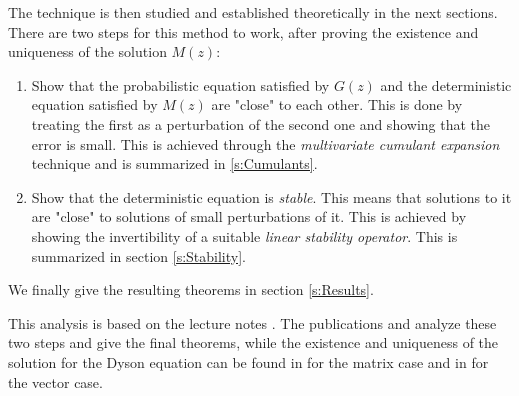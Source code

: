 \documentclass[11pt, a4paper, oneside]{book}
\numberwithin{equation}{chapter}
\begin{document}
 The technique is then studied and established theoretically in the next sections. There are two steps for this method to work, after proving the existence and uniqueness of the solution $M(z)$:
\begin{enumerate}
    \item Show that the probabilistic equation satisfied by $G(z)$ and the deterministic equation satisfied by $M(z)$ are "close" to each other. This is done by treating the first as a perturbation of the second one and showing that the error is small. This is achieved through the \textit{multivariate cumulant expansion} technique and is summarized in \ref{s:Cumulants}.

    \item Show that the deterministic equation is \textit{stable}. This means that solutions to it are "close" to solutions of small perturbations of it. This is achieved by showing the invertibility of a suitable \textit{linear stability operator}. This is summarized in section \ref{s:Stability}.
\end{enumerate}
We finally give the resulting theorems in section \ref{s:Results}. 

This analysis is based on the lecture notes \cite{erdos2019matrix}. The publications \cite{erdHos2019random} and \cite{ajanki2019stability} analyze these two steps and give the final theorems, while the existence and uniqueness of the solution for the Dyson equation can be found in \cite{helton2007operator} for the matrix case and in \cite{ajanki2019quadratic} for the vector case.
 
\end{document}
